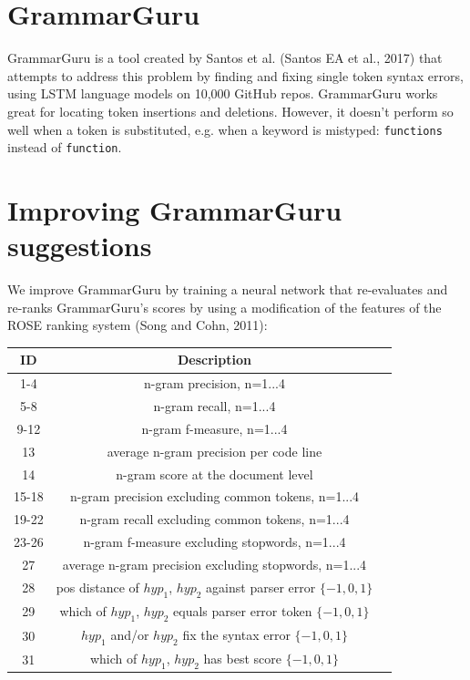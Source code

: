 \documentclass[a0,portrait]{a0poster}
\begin{document}
\begin{multicols}{2}

\color{Navy}
\section*{GrammarGuru}

GrammarGuru is a tool created by Santos et al. (Santos EA et al., 2017) that attempts to address this problem by finding and fixing single token syntax errors, using LSTM language models on 10,000 GitHub repos. GrammarGuru works great for locating token insertions and deletions. However, it doesn't perform so well when a token is substituted, e.g. when a keyword is mistyped: \texttt{functions} instead of \texttt{function}.


\section*{Improving GrammarGuru suggestions}

 We improve GrammarGuru by training a neural network that re-evaluates and re-ranks GrammarGuru's scores by using a modification of the features of the ROSE ranking system (Song and Cohn, 2011):

\color{Black}
\begin{center}
\begin{tabular}{ |c|c|c| }
 \hline
 \textbf{ID} & \textbf{Description}\\
 \hline
 1-4 & n-gram precision, n=1...4\\
 5-8 & n-gram recall, n=1...4 \\
 9-12 & n-gram f-measure, n=1...4 \\
 13 & average n-gram precision per code line\\
 14 & n-gram score at the document level \\
 15-18 & n-gram precision excluding common tokens, n=1...4\\
 19-22 & n-gram recall excluding common tokens, n=1...4\\
 23-26 & n-gram f-measure excluding stopwords, n=1...4\\
 27 & average n-gram precision excluding stopwords, n=1...4\\
 28 & pos distance of $hyp_1$, $hyp_2$ against parser error $\{-1, 0, 1 \}$\\
 29 & which of $hyp_1$, $hyp_2$ equals parser error token $\{ -1, 0, 1\}$\\
 30 & $hyp_1$ and/or $hyp_2$ fix the syntax error $\{ -1, 0, 1\}$ \\
 31 & which of $hyp_1$, $hyp_2$ has best score $\{-1, 0, 1\}$\\
 \hline
\end{tabular}
\end{center}


\end{multicols}
\end{document}

